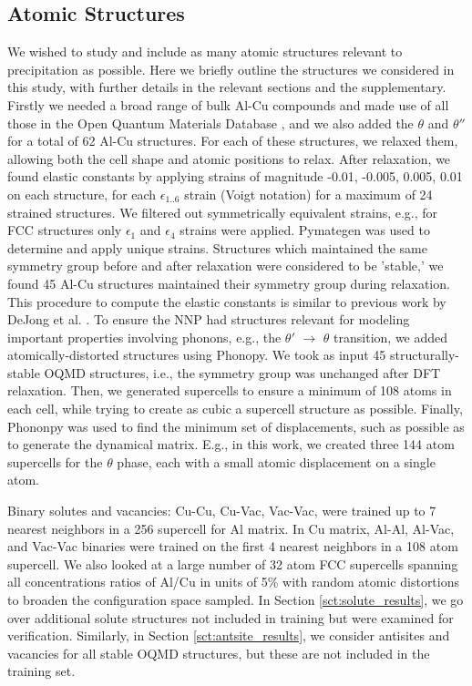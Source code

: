 \documentclass{article}
\begin{document}
\subsection{Atomic Structures} \label{scn:atomic_structures}
We wished to study and include as many atomic structures relevant to precipitation as possible.
Here we briefly outline the structures we considered in this study, with further details in the relevant sections and the supplementary.  
Firstly we needed a broad range of bulk Al-Cu compounds and made use of all those in the Open Quantum Materials Database \cite{Kirklin2015}, and we also added the $\theta$ and $\theta''$ for a total of 62 Al-Cu structures. 
For each of these structures, we relaxed them, allowing both the cell shape and atomic positions to relax.
After relaxation, we found elastic constants by applying strains of magnitude -0.01, -0.005, 0.005, 0.01 on
each structure, for each $\epsilon_{1..6}$ strain (Voigt notation) for a maximum of 24 strained structures.
We filtered out symmetrically equivalent strains, e.g., for FCC structures only $\epsilon_1$ and $\epsilon_4$
strains were applied.
Pymategen\cite{Ong2013} was used to determine and apply unique strains. 
Structures which maintained the same symmetry group before and after relaxation were considered to be 'stable,'
we found 45 Al-Cu structures maintained their symmetry group during relaxation. 
This procedure to compute the elastic constants is similar to previous work by DeJong et al. \cite{DeJong2015}.
To ensure the NNP had structures relevant for modeling important properties involving phonons, e.g., the $\theta'$ $\rightarrow$ $\theta$ transition, we added atomically-distorted structures using Phonopy\cite{Togo2015FirstScience}.
We took as input 45 structurally-stable OQMD structures, i.e., the symmetry group was unchanged after DFT relaxation.
Then, we generated supercells to ensure a minimum of 108 atoms in each cell, while trying to create as cubic a supercell structure as possible.
Finally, Phononpy was used to find the minimum set of displacements, such as possible as to generate the dynamical matrix.
E.g., in this work, we created three 144 atom supercells for the $\theta$ phase, each with a small atomic displacement on a single atom.  

Binary solutes and vacancies: Cu-Cu, Cu-Vac, Vac-Vac, were trained up to 7 nearest neighbors in a 256 supercell for Al matrix. 
In Cu matrix, Al-Al, Al-Vac, and Vac-Vac binaries were trained on the first 4 nearest neighbors in a 108 atom supercell. 
We also looked at a large number of 32 atom FCC supercells spanning all concentrations ratios of Al/Cu in units of 5\%  with random atomic distortions to broaden the configuration space sampled.
In Section \ref{sct:solute_results}, we go over additional solute structures not included in training but were examined for verification.
Similarly, in Section \ref{sct:antsite_results}, we consider antisites and vacancies for all stable OQMD structures, but these are not included in the training set.
\end{document}
